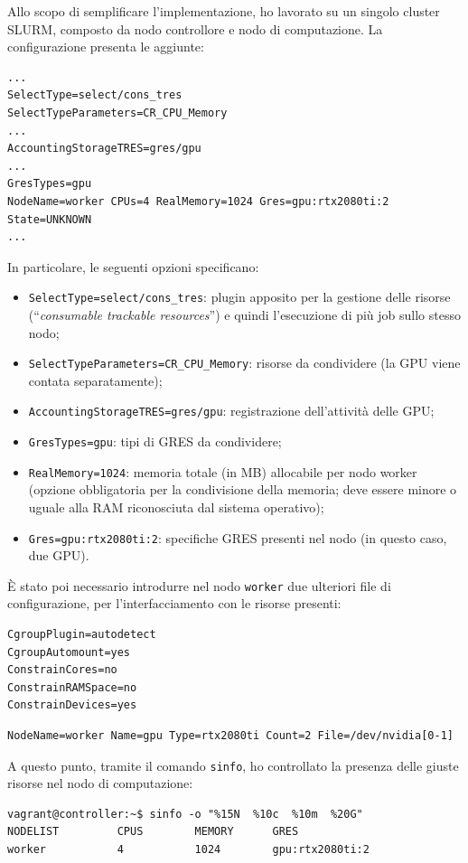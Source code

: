 \documentclass[12pt,a4paper,twoside,openright]{book}
\begin{document}
Allo scopo di semplificare l'implementazione, ho lavorato su un singolo cluster \ac{SLURM}, composto da nodo controllore e nodo di computazione. La configurazione presenta le aggiunte:
\begin{verbatim}
...
SelectType=select/cons_tres
SelectTypeParameters=CR_CPU_Memory
...
AccountingStorageTRES=gres/gpu
...
GresTypes=gpu
NodeName=worker CPUs=4 RealMemory=1024 Gres=gpu:rtx2080ti:2 State=UNKNOWN
...
\end{verbatim}
In particolare, le seguenti opzioni specificano:
\begin{itemize}
    \item \texttt{SelectType=select/cons_tres}: plugin apposito per la gestione delle risorse (``\textit{consumable trackable resources}'') e quindi l'esecuzione di più job sullo stesso nodo;
    \item \texttt{SelectTypeParameters=CR_CPU_Memory}: risorse da condividere (la \ac{GPU} viene contata separatamente);
    \item \texttt{AccountingStorageTRES=gres/gpu}: registrazione dell'attività delle \ac{GPU};
    \item \texttt{GresTypes=gpu}: tipi di \ac{GRES} da condividere;
    \item \texttt{RealMemory=1024}: memoria totale (in \ac{MB}) allocabile per nodo worker (opzione obbligatoria per la condivisione della memoria; deve essere minore o uguale alla \ac{RAM} riconosciuta dal sistema operativo);
    \item \texttt{Gres=gpu:rtx2080ti:2}: specifiche \ac{GRES} presenti nel nodo (in questo caso, due \ac{GPU}).
\end{itemize}
È stato poi necessario introdurre nel nodo \texttt{worker} due ulteriori file di configurazione, per l'interfacciamento con le risorse presenti:
\begin{verbatim}
CgroupPlugin=autodetect
CgroupAutomount=yes
ConstrainCores=no
ConstrainRAMSpace=no
ConstrainDevices=yes
\end{verbatim}
\begin{verbatim}
NodeName=worker Name=gpu Type=rtx2080ti Count=2 File=/dev/nvidia[0-1]
\end{verbatim}
A questo punto, tramite il comando \texttt{sinfo}, ho controllato la presenza delle giuste risorse nel nodo di computazione:
\begin{verbatim}
vagrant@controller:~$ sinfo -o "%15N  %10c  %10m  %20G"
NODELIST         CPUS        MEMORY      GRES
worker           4           1024        gpu:rtx2080ti:2
\end{verbatim}
\end{document}
